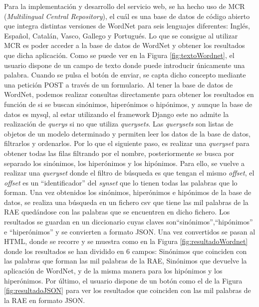 Para la implementación y desarrollo del servicio web, se ha hecho uso de MCR (\textit{Multilingual Central Repository}), el cuál es una base de datos de código abierto que integra distintas versiones de WordNet para seis lenguajes diferentes: Inglés, Español, Catalán, Vasco, Gallego y Portugués. 
Lo que se consigue al utilizar MCR es poder acceder a la base de datos de WordNet y obtener los resultados que dicha aplicación.
Como se puede ver en la Figura \ref{fig:textoWordnet}, el usuario dispone de un campo de texto donde puede introducir únicamente una palabra. Cuando se pulsa el botón de enviar, se capta dicho concepto mediante una petición POST a través de un formulario.
Al tener la base de datos de WordNet, podemos realizar consultas directamente para obtener los resultados en función de si se buscan sinónimos, hiperónimos o hipónimos, y aunque la base de datos es mysql, al estar utilizando el framework Django este no admite la realización de \textit{querys} si no que utiliza \textit{querysets}.  Las \textit{querysets} son listas de objetos de un modelo determinado y permiten leer los datos de la base de datos, filtrarlos y ordenarlos.
Por lo que el siguiente paso, es realizar una \textit{queryset} para obtener todas las filas filtrando por el nombre, posteriormente se busca por separado los sinónimos, los hiperónimos y los hipónimos. Para ello, se vuelve a realizar una \textit{queryset} donde el filtro de búsqueda es que tengan el mismo \textit{offset}, el \textit{offset} es un ``identificador'' del \textit{synset} que lo tienen todas las palabras que lo forman.
Una vez obtenidos los sinónimos, hiperónimos e hipónimos de la base de datos, se realiza una búsqueda en un fichero csv que tiene las mil palabras de la RAE quedándose con las palabras que se encuentren en dicho fichero.
Los resultados se guardan en un diccionario cuyas claves son``sinónimos'',``hipónimos'' e ``hiperónimos'' y se convierten a formato JSON. Una vez convertidos se pasan al HTML, donde se recorre y se muestra como en la Figura \ref{fig:resultadoWordnet} donde los resultados se han dividido en 6 campos: Sinónimos que coinciden con las palabras que forman las mil palabras de la RAE, Sinónimos que devuelve la aplicación de WordNet, y de la misma manera para los hipónimos y los hiperónimos.
Por último, el usuario dispone de un botón como el de la Figura \ref{fig:resultadoJSON} para ver los resultados que coinciden con las mil palabras de la RAE en formato JSON.
